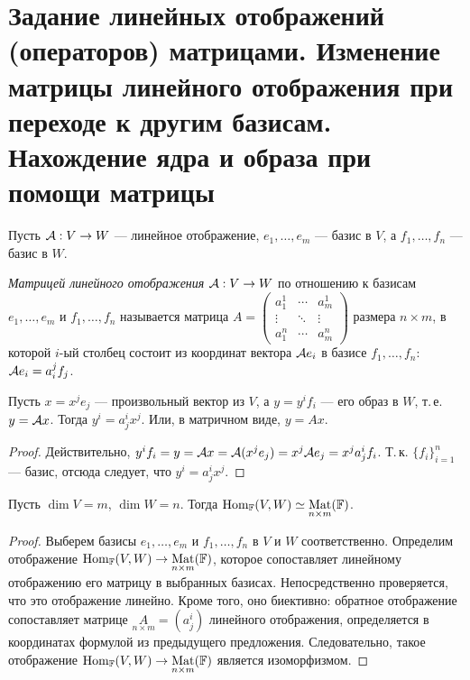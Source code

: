 \section{Задание линейных отображений (операторов) матрицами. Изменение матрицы линейного отображения при переходе к другим базисам. Нахождение ядра и образа при помощи матрицы}

Пусть $\mathcal{A}: V \to W$ --- линейное отображение, $e_1, \ldots, e_m$ --- базис в $V$, а $f_1, \ldots, f_n$ --- базис в $W$.

\begin{definition}
    \textit{Матрицей линейного отображения} $\mathcal{A}: V \to W$ по отношению к базисам $e_1, \ldots, e_m$ и $f_1, \ldots, f_n$ называется матрица
    $
    A = 
    \begin{pmatrix}
        a^1_1 & \cdots & a^1_m\\
        \vdots & \ddots & \vdots\\
        a^n_1 & \cdots & a^n_m
    \end{pmatrix}
    $
    размера $n \times m$, в которой $i$-ый столбец состоит из координат вектора $\mathcal{A} e_i$ в базисе $f_1, \ldots, f_n$: $\mathcal{A} e_i = a^j_if_j$.
\end{definition}

\begin{proposal}
    Пусть $x = x^je_j$ --- произвольный вектор из $V$, а $y = y^if_i$ --- его образ в $W$, т.\,е. $y = \mathcal{A} x$. Тогда $y^i = a^i_jx^j$. Или, в матричном виде, $y = Ax$.
\end{proposal}

\begin{proof}
    Действительно, $y^if_i = y = \mathcal{A} x = \mathcal{A}(x^je_j) = x^j\mathcal{A} e_j = x^ja^i_jf_i$. Т.\,к. $\{f_i\}_{i = 1}^n$ --- базис, отсюда следует, что $y^i = a^i_jx^j$.
\end{proof}

\begin{proposal}
    Пусть $\dim V = m$, $\dim W = n$. Тогда $\operatorname{Hom}_{\mathbb{F}}(V, W) \simeq \underset{n \times m}{\operatorname{Mat}}(\mathbb{F})$.
\end{proposal}

\begin{proof}
    Выберем базисы $e_1, \ldots, e_m$ и $f_1, \ldots, f_n$ в $V$ и $W$ соответственно. Определим отображение $\operatorname{Hom}_{\mathbb{F}}(V, W) \to \underset{n \times m}{\operatorname{Mat}}(\mathbb{F})$, которое сопоставляет линейному отображению его матрицу в выбранных базисах. Непосредственно проверяется, что это отображение линейно. Кроме того, оно биективно: обратное отображение сопоставляет матрице $\underset{n \times m}{A} = (a^i_j)$ линейного отображения, определяется в координатах формулой из предыдущего предложения. Следовательно, такое отображение $\operatorname{Hom}_{\mathbb{F}}(V, W) \to \underset{n \times m}{\operatorname{Mat}}(\mathbb{F})$ является изоморфизмом.
\end{proof}

